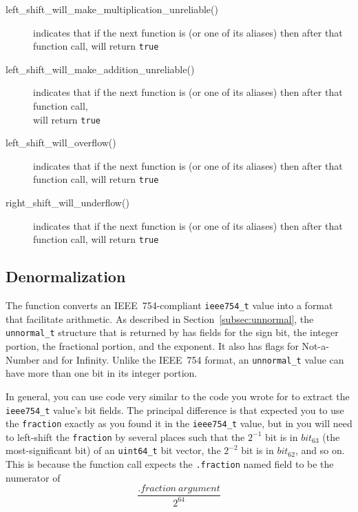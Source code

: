 \begin{itemize}
\begin{description}
        \item[left\_shift\_will\_make\_multiplication\_unreliable()] indicates that if the next function is  (or one of its aliases) then after that function call,  will return \lstinline{true}
        \item[left\_shift\_will\_make\_addition\_unreliable()] indicates that if the next function is  (or one of its aliases) then after that function call, \\  will return \lstinline{true}
        \item[left\_shift\_will\_overflow()] indicates that if the next function is  (or one of its aliases) then after that function call,  will return \lstinline{true}
        \item[right\_shift\_will\_underflow()] indicates that if the next function is  (or one of its aliases) then after that function call,  will return \lstinline{true}
    \end{description}
\end{itemize}

\subsection{Denormalization}

The  function converts an IEEE~754-compliant \lstinline{ieee754_t} value into a format that facilitate arithmetic.
As described in Section~\ref{subsec:unnormal}, the \lstinline{unnormal_t} structure that is returned by  has fields for the sign bit, the integer portion, the fractional portion, and the exponent.
It also has flags for Not-a-Number and for Infinity.
Unlike the IEEE~754 format, an \lstinline{unnormal_t} value can have more than one bit in its integer portion.

In general, you can use code very similar to the code you wrote for  to extract the \lstinline{ieee754_t} value's bit fields.
The principal difference is that  expected you to use the \lstinline{fraction} exactly as you found it in the \lstinline{ieee754_t} value,
but in  you will need to left-shift the \lstinline{fraction} by several places such that the $2^{-1}$ bit is in $bit_{63}$ (the most-significant bit) of an \lstinline{uint64_t} bit vector, the $2^{-2}$ bit is in $bit_{62}$, and so on.
This is because the  function call expects the \lstinline{.fraction} named field to be the numerator of
\[\frac{.fraction\ argument}{2^{64}}\]

